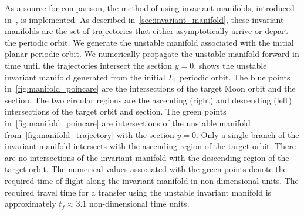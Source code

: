As a source for comparison, the method of using invariant manifolds, introduced in~\cite{koon2011}, is implemented.
As described in~\cref{sec:invariant_manifold}, these invariant manifolds are the set of trajectories that either asymptotically arrive or depart the periodic orbit. 
We generate the unstable manifold associated with the initial planar periodic orbit.
We numerically propagate the unstable manifold forward in time until the trajectories intersect the \Poincare section \( y = 0 \).
 shows the unstable invariant manifold generated from the initial \( L_1\) periodic orbit. 
The blue points in~\cref{fig:manifold_poincare} are the intersections of the target Moon orbit and the \Poincare section.
The two circular regions are the ascending (right) and descending (left) intersections of the target orbit and \Poincare section.
The green points in~\cref{fig:manifold_poincare} are intersections of the unstable manifold from~\cref{fig:manifold_trajectory} with the \Poincare section \( y = 0 \).
Only a single branch of the invariant manifold intersects with the ascending region of the target orbit.
There are no intersections of the invariant manifold with the descending region of the target orbit.
The numerical values associated with the green points denote the required time of flight along the invariant manifold in non-dimensional units.
The required travel time for a transfer using the unstable invariant manifold is  approximately \( t_f \approx 3.1\) non-dimensional time units.
